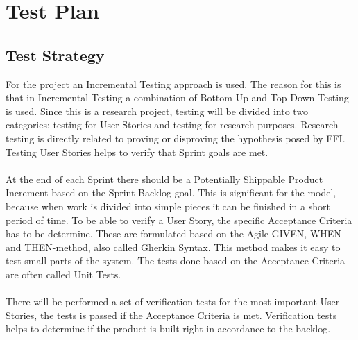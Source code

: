 \section{Test Plan}
\subsection{Test Strategy}
For the project an Incremental Testing approach is used. The reason for this is that in Incremental Testing a combination of Bottom-Up and Top-Down Testing is used. Since this is a research project, testing will be divided into two categories; testing for User Stories and testing for research purposes. Research testing is directly related to proving or disproving the hypothesis posed by FFI. Testing User Stories helps to verify that Sprint goals are met. \\
\\
At the end of each Sprint there should be a Potentially Shippable Product Increment based on the Sprint Backlog goal. This is significant for the model, because when work is divided into simple pieces it can be finished in a short period of time. To be able to verify a User Story, the specific Acceptance Criteria has to be determine. These are formulated based on the Agile GIVEN, WHEN and THEN-method, also called Gherkin Syntax. This method makes it easy to test small parts of the system. The tests done based on the Acceptance Criteria are often called Unit Tests.\\
\\
There will be performed a set of verification tests for the most important User Stories, the tests is passed if the Acceptance Criteria is met. Verification tests helps to determine if the product is built right in accordance to the backlog. \\
\\
\newpage

